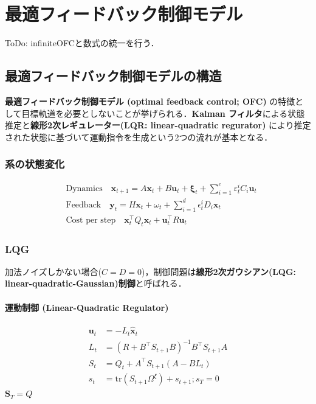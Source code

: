 \section{最適フィードバック制御モデル}
ToDo: infiniteOFCと数式の統一を行う．
\subsection{最適フィードバック制御モデルの構造}
\textbf{最適フィードバック制御モデル (optimal feedback control; OFC)} の特徴として目標軌道を必要としないことが挙げられる．\textbf{Kalman フィルタ}による状態推定と\textbf{線形2次レギュレーター(LQR: linear-quadratic regurator)} により推定された状態に基づいて運動指令を生成という2つの流れが基本となる．
\subsubsection{系の状態変化}
\begin{align}
&\text {Dynamics} \quad \mathbf{x}_{t+1}=A \mathbf{x}_{t}+B \mathbf{u}_{t}+\boldsymbol{\xi}_{t}+\sum_{i=1}^{c} \varepsilon_{t}^{i} C_{i} \mathbf{u}_{t}\\
&\text {Feedback} \quad \mathbf{y}_{t}=H \mathbf{x}_{t}+\omega_{t}+\sum_{i=1}^{d} \epsilon_{t}^{i} D_{i} \mathbf{x}_{t}\\
&\text{Cost per step}\quad \mathbf{x}_{t}^\top Q_{t} \mathbf{x}_{t}+\mathbf{u}_{t}^\top R \mathbf{u}_{t}
\end{align}
\subsubsection{LQG}
加法ノイズしかない場合($C=D=0$)，制御問題は\textbf{線形2次ガウシアン(LQG: linear-quadratic-Gaussian)制御}と呼ばれる．
\paragraph{運動制御 (Linear-Quadratic Regulator)}
\begin{align}
\mathbf{u}_{t}&=-L_{t} \widehat{\mathbf{x}}_{t}\\
L_{t}&=\left(R+B^{\top} S_{t+1} B\right)^{-1} B^{\top} S_{t+1} A\\
S_{t}&=Q_{t}+A^{\top} S_{t+1}\left(A-B L_{t}\right)\\
s_t &= \mathrm{tr}(S_{t+1}\Omega^\xi) + s_{t+1}; s_T=0
\end{align}
$\boldsymbol{S}_{T}=Q$
